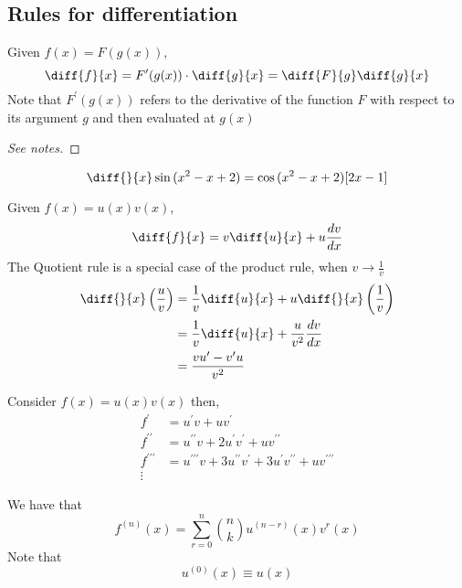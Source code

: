 \documentclass{article}
\begin{document}
\subsection{Rules for differentiation}
\begin{thm}
    Given $f(x) = F(g(x))$,
    \[
        \diff{f}{x} = F^{\prime}(g(x)) \cdot \diff{g}{x}   = \diff{F}{g}\diff{g}{x}
    \]
    Note that $F^{\prime}(g(x))$ refers to the derivative of the function $F$ with respect to its argument $g$ and then evaluated at $g(x)$
\end{thm}

\begin{proof}[See notes]
    
\end{proof}

\begin{eg}
    \[
        \diff{}{x} \sin{(x^2 -x +2)} = \cos{(x^2 -x +2)}[2x - 1]
    \]
\end{eg}

\begin{thm}
    Given $f(x) = u(x)v(x)$,
    \[
        \diff{f}{x} = v \diff{u}{x} + u \frac{dv}{dx}
    \]
    The Quotient rule is a special case of the product rule, when $v \rightarrow \frac{1}{v}$
    \begin{align*}
        \diff{}{x}\left(\frac{u}{v}\right) &= \frac{1}{v}\diff{u}{x} + u \diff{}{x}\left(\frac{1}{v}\right) \\
        &= \frac{1}{v}\diff{u}{x} + \frac{u}{v^2} \frac{dv}{dx} \\
        &= \frac{vu^{\prime} - v^{\prime}u}{v^2}
    \end{align*}
\end{thm}

\begin{thm}
    Consider $f(x) = u(x)v(x)$ then,
    \begin{align*}
        f^{\prime} &= u^{\prime}v + uv^{\prime} \\
        f^{\prime\prime} &= u^{\prime\prime}v + 2u^{\prime}v^{\prime} + uv^{\prime\prime} \\
        f^{\prime\prime\prime} &= u^{\prime\prime\prime}v + 3u^{\prime\prime}v^{\prime} + 3u^{\prime}v^{\prime\prime} + uv^{\prime\prime\prime} \\
        \vdots
    \end{align*}

    We have that
    \[
        f^{(n)}(x) = \sum_{r=0}^{n}{\binom{n}{k}u^{(n-r)}(x)v^{r}(x)}
    \]
    Note that
    \[
        u^{(0)}(x) \equiv u(x)  
    \]
\end{thm}
\end{document}

